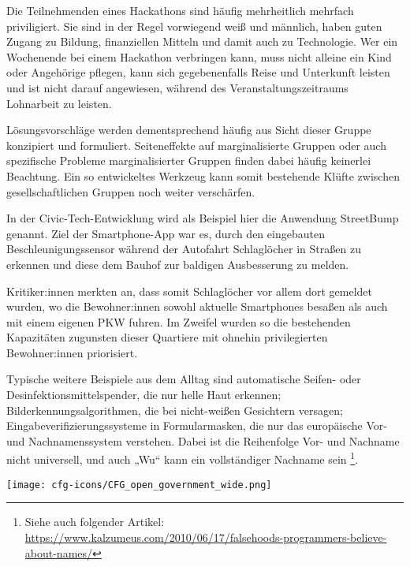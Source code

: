 Die Teilnehmenden eines Hackathons sind häufig mehrheitlich mehrfach priviligiert. Sie sind in der Regel vorwiegend weiß und männlich, haben guten Zugang zu Bildung, finanziellen Mitteln und damit auch zu Technologie. Wer ein Wochenende bei einem Hackathon verbringen kann, muss nicht alleine ein Kind oder Angehörige pflegen, kann sich gegebenenfalls Reise und Unterkunft leisten und ist nicht darauf angewiesen, während des Veranstaltungszeitraums Lohnarbeit zu leisten. 

Lösungsvorschläge werden dementsprechend häufig aus Sicht dieser Gruppe konzipiert und formuliert. Seiteneffekte auf marginalisierte Gruppen oder auch spezifische Probleme marginalisierter Gruppen finden dabei häufig keinerlei Beachtung. Ein so entwickeltes Werkzeug kann somit bestehende Klüfte zwischen gesellschaftlichen Gruppen noch weiter verschärfen.

\begin{kaobox}
	In der Civic-Tech-Entwicklung wird als Beispiel hier die Anwendung StreetBump genannt. Ziel der Smartphone-App war es, durch den eingebauten Beschleunigungssensor während der Autofahrt Schlaglöcher in Straßen zu erkennen und diese dem Bauhof zur baldigen Ausbesserung zu melden. 
	
	Kritiker:innen merkten an, dass somit Schlaglöcher vor allem dort gemeldet wurden, wo die Bewohner:innen sowohl aktuelle Smartphones besaßen als auch mit einem eigenen PKW fuhren. Im Zweifel wurden so die bestehenden Kapazitäten zugunsten dieser Quartiere mit ohnehin privilegierten Bewohner:innen priorisiert.
	
	Typische weitere Beispiele aus dem Alltag sind automatische Seifen- oder Desinfektionsmittelspender, die nur helle Haut erkennen; Bilderkennungsalgorithmen, die bei nicht-weißen Gesichtern versagen; Eingabeverifizierungssysteme in Formularmasken, die nur das europäische Vor- und Nachnamenssystem verstehen. Dabei ist die Reihenfolge Vor- und Nachname nicht universell, und auch „Wu“ kann ein vollständiger Nachname sein \footnote{Siehe auch folgender Artikel: \url{https://www.kalzumeus.com/2010/06/17/falsehoods-programmers-believe-about-names/}}.
\end{kaobox}


\vspace{0cm}
\begin{figure*}[h!]
	\texttt{[image: cfg-icons/CFG\_open\_government\_wide.png]}
\end{figure*}

